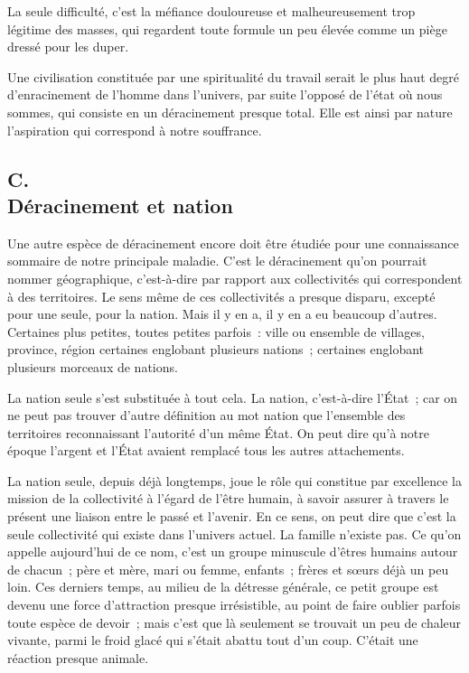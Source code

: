 \documentclass[french,twoside]{book} %
\begin{document}
La seule difficulté, c'est la méfiance douloureuse et malheureusement trop légitime des masses, qui regardent toute formule un peu élevée comme un piège dressé pour les duper.\par
Une civilisation constituée par une spiritualité du travail serait le plus haut degré d'enracinement de l'homme dans l'univers, par suite l'opposé de l'état où nous sommes, qui consiste en un déracinement presque total. Elle est ainsi par nature l'aspiration qui correspond à notre souffrance.
\subsection[{C. Déracinement et nation}]{C. \\
Déracinement et nation}
\noindent \par
Une autre espèce de déracinement encore doit être étudiée pour une connaissance sommaire de notre principale maladie. C'est le déracinement qu'on pourrait nommer géographique, c'est-à-dire par rapport aux collectivités qui correspondent à des territoires. Le sens même de ces collectivités a presque disparu, excepté pour une seule, pour la nation. Mais il y en a, il y en a eu beaucoup d'autres. Certaines plus petites, toutes petites parfois : ville ou ensemble de villages, province, région certaines englobant plusieurs nations ; certaines englobant plusieurs morceaux de nations.\par
La nation seule s'est substituée à tout cela. La nation, c'est-à-dire l'État ; car on ne peut pas trouver d'autre définition au mot nation que l'ensemble des territoires reconnaissant l'autorité d'un même État. On peut dire qu'à notre époque l'argent et l'État avaient remplacé tous les autres attachements.\par
La nation seule, depuis déjà longtemps, joue le rôle qui constitue par excellence la mission de la collectivité à l'égard de l'être humain, à savoir assurer à travers le présent une liaison entre le passé et l'avenir. En ce sens, on peut dire que c'est la seule collectivité qui existe dans l'univers actuel. La famille n'existe pas. Ce qu'on appelle aujourd'hui de ce nom, c'est un groupe minuscule d'êtres humains autour de chacun ; père et mère, mari ou femme, enfants ; frères et sœurs déjà un peu loin. Ces derniers temps, au milieu de la détresse générale, ce petit groupe est devenu une force d'attraction presque irrésistible, au point de faire oublier parfois toute espèce de devoir ; mais c'est que là seulement se trouvait un peu de chaleur vivante, parmi le froid glacé qui s’était abattu tout d'un coup. C'était une réaction presque animale.\par
\end{document}
